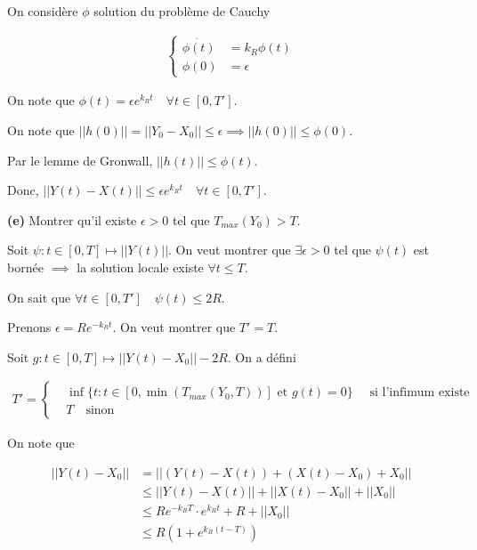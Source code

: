 \documentclass[french]{article}
\begin{document}
	On considère $\phi$ solution du problème de Cauchy
	
	\begin{align}
		\begin{cases}
		\dot{\phi(t)} &= k_R\phi(t)\\
		\phi(0) &= \epsilon
		\end{cases}
	\end{align}
	
	On note que $\phi(t) = \epsilon e^{k_Rt} \quad \forall t \in [0, T']$.
	
	On note que $||h(0)|| = ||Y_0 - X_0|| \leq \epsilon \implies ||h(0)|| \leq \phi(0)$.
	
	Par le lemme de Gronwall, $||h(t)|| \leq \phi(t)$.
	
	Donc, $ || Y(t) - X(t) || \leq \epsilon e^{k_Rt} \quad \forall t \in [0, T']$.
	
	\begin{tcolorbox}[colback=gray!5!white,colframe=gray!75!black]
		\textbf{\large{(e)}} Montrer qu'il existe $\epsilon > 0$ tel que $T_{max}(Y_0) > T$.
	\end{tcolorbox}

	Soit $\psi: t \in [0, T] \mapsto ||Y(t)||$. On veut montrer que $\exists \epsilon > 0$ tel que $\psi(t)$ est bornée $\implies$ la solution locale existe $\forall t \leq T$.
	
	On sait que $\forall t \in [0, T'] \quad \psi(t) \leq 2R$. 
	
	Prenons $\epsilon = Re^{-k_Rt}$. On veut montrer que $T' = T$.
	
	Soit $g: t \in [0, T] \mapsto ||Y(t) - X_0|| - 2R$. On a défini 
	
	\begin{align}
	T' = 
	\begin{cases}
	&\inf \{ t : t \in [0, \min(T_{max}(Y_0, T))] \text{ et } g(t) = 0 \} \quad \text{ si l'infimum existe }\\
	&T \quad \text{sinon}
	\end{cases}
	\end{align}
	
	On note que
	
	\begin{align}
		|| Y(t) - X_0 || &= || (Y(t) - X(t)) + (X(t) - X_0) + X_0 ||\\
							&\leq ||Y(t) - X(t)|| + ||X(t)-X_0|| + ||X_0||\\
							&\leq Re^{-k_RT} \cdot e^{k_Rt} + R + ||X_0||\\
							&\leq R(1 + e^{k_R(t-T)})
	\end{align}
	
\end{document}
